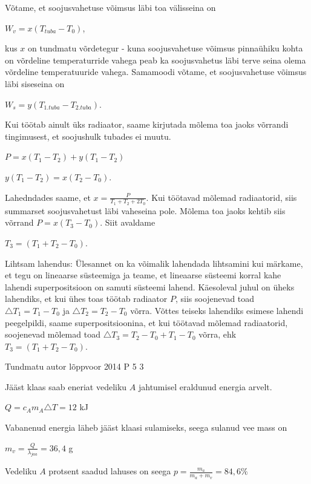\documentclass[11pt]{article}
\begin{document}
{{\ifSolution
Võtame, et soojusvahetuse võimsus läbi toa välisseina on
\begin{center}
$W_v = x(T_{tuba} - T_0)$,
\end{center}
kus $x$ on tundmatu võrdetegur - kuna soojusvahetuse võimsus pinnaühiku kohta on võrdeline temperaturride vahega peab ka soojusvahetus läbi terve seina olema võrdeline temperatuuride vahega. Samamoodi võtame, et soojusvahetuse võimsus läbi siseseina on
\begin{center}
$W_s = y(T_{1. tuba} - T_{2. tuba})$.
\end{center}
Kui töötab ainult üks radiaator, saame kirjutada mõlema toa jaoks võrrandi tingimusest, et soojushulk tubades ei muutu.
\begin{center}
$P = x(T_1 - T_2) + y(T_1 - T_2)$
\end{center}
\begin{center}
$y(T_1 - T_2) = x(T_2 - T_0)$.
\end{center}
Lahedndades saame, et $x = \frac{P}{T_1 + T_2 + 2T_0}$. Kui töötavad mõlemad radiaatorid, siis summarset soojusvahetust läbi vaheseina pole. Mõlema toa jaoks kehtib siis võrrand $P = x(T_3 - T_0)$. Siit avaldame
\begin{center}
$T_3 = (T_1 + T_2 - T_0)$.
\end{center}

Lihtsam lahendus:
Ülesannet on ka võimalik lahendada lihtsamini kui märkame, et tegu on lineaarse süsteemiga ja teame, et lineaarse süsteemi korral kahe lahendi superpositsioon on samuti süsteemi lahend. Käesoleval juhul on üheks lahendiks, et kui ühes toas töötab radiaator $P$, siis soojenevad toad $\triangle T_1 = T_1 - T_0$ ja $\triangle T_2 = T_2 - T_0$ võrra. Võttes teiseks lahendiks esimese lahendi peegelpildi, saame superpositsioonina, et kui töötavad mõlemad radiaatorid, soojenevad mõlemad toad $\triangle T_3 = T_2 - T_0 + T_1 - T_0$ võrra, ehk $T_3 = (T_1 + T_2 - T_0)$. 
\fi
}

{Tundmatu autor} %
{lõppvoor} %
{2014} %
{P 5} %
{3} %
{

\ifSolution
Jääst klaas saab eneriat vedeliku $A$ jahtumisel eraldunud energia arvelt.
\begin{center}
$Q = c_A m_A \triangle T = 12$ kJ
\end{center}
Vabanenud energia läheb jääst klaasi sulamiseks, seega sulanud vee mass on
\begin{center}
$m_v = \frac{Q}{\lambda_{jaa}} = 36,4$ g
\end{center}
Vedeliku $A$ protsent saadud lahuses on seega $p = \frac{m_a}{m_a + m_v} = 84,6 \%$
\fi
}

}
\end{document}
